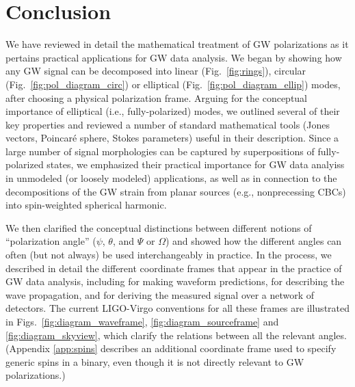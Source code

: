 \documentclass[aps,prd,twocolumn,superscriptaddress,preprintnumbers,floatfix,nofootinbib]{revtex4-2}
\begin{document}
\section{Conclusion}
\label{sec:conclusion}

We have reviewed in detail the mathematical treatment of GW polarizations as it pertains practical applications for GW data analysis.
We began by showing how any GW signal can be decomposed into linear (Fig.~\ref{fig:rings}), circular (Fig.~\ref{fig:pol_diagram_circ}) or elliptical (Fig.~\ref{fig:pol_diagram_ellip}) modes, after choosing a physical polarization frame.
Arguing for the conceptual importance of elliptical (i.e., fully-polarized) modes, we outlined several of their key properties and reviewed a number of standard mathematical tools (Jones vectors, Poincar\'{e} sphere, Stokes parameters) useful in their description.
Since a large number of signal morphologies can be captured by superpositions of fully-polarized states, we emphasized their practical importance for GW data analyiss in unmodeled (or loosely modeled) applications, as well as in connection to the decompositions of the GW strain from planar sources (e.g., nonprecessing \acp{CBC}) into spin-weighted spherical harmonic.

We then clarified the conceptual distinctions between different notions of ``polarization angle'' ($\psi$, $\theta$, and $\Psi$ or $\Omega$) and showed how the different angles can often (but not always) be used interchangeably in practice.
In the process, we described in detail the different coordinate frames that appear in the practice of GW data analysis, including for making waveform predictions, for describing the wave propagation, and for deriving the measured signal over a network of detectors.
The current LIGO-Virgo conventions for all these frames are illustrated in Figs.~\ref{fig:diagram_waveframe}, \ref{fig:diagram_sourceframe} and \ref{fig:diagram_skyview}, which clarify the relations between all the relevant angles.
(Appendix \ref{app:spins} describes an additional coordinate frame used to specify generic spins in a binary, even though it is not directly relevant to GW polarizations.)
\end{document}
